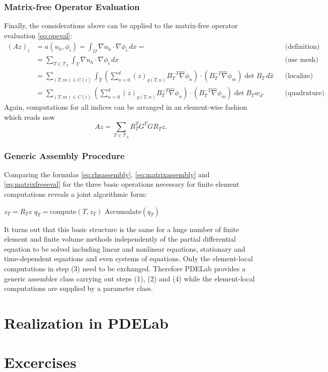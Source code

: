 \documentclass[a4paper,
		     11pt,
		     DIV12,
		     DIVcalc,
		     headings=normal,
		     oneside,
		     bibliography=totoc,
		     headsepline=false,
		     headinclude]{scrartcl}
\begin{document}
\subsubsection*{Matrix-free Operator Evaluation}

Finally, the considerations above can be applied to the matrix-free operator
evaluation \eqref{eq:opeval}:
\begin{align*}
(Az)_i  &= a(u_h,\phi_i) =  \int_\Omega \nabla u_h \cdot \nabla \phi_i \,dx =
&&\text{(definition)} \\ 
&= \sum_{T\in\mathcal{T}_h} \int_T \nabla u_h \cdot \nabla \phi_i \,dx
&&\text{(use mesh)}\\
&= \sum_{(T,m)\in C(i)}
\int_{\hat T} 
\left(\sum_{n=0}^d (z)_{g(T,n)} B_T^{-T} \hat\nabla\phi_n\right)
\cdot (B_T^{-T} \hat\nabla\phi_m) \det B_T \,d\hat x &&\text{(localize)}\\
&= \sum_{(T,m)\in C(i)}
\left(\sum_{n=0}^d (z)_{g(T,n)} B_T^{-T} \hat\nabla\phi_n\right)
\cdot (B_T^{-T} \hat\nabla\phi_m) \det B_T w_d . &&\text{(quadrature)}
\end{align*}
Again, computations for all indices can be arranged in an element-wise fashion
which reads now
\begin{equation}
Az =  \sum_{T\in\mathcal{T}_h} R_T^T G^T G R_T z.
\label{eq:matrixfreeeval}
\end{equation}

\subsubsection*{Generic Assembly Procedure}

Comparing the formulas \eqref{eq:rhsassembly}, \eqref{eq:matrixassembly}
and \eqref{eq:matrixfreeeval} for the three basic operations necessary for
finite element computations reveals a joint algorithmic form:
\begin{algorithmic}[1]
 
\State $z_T = R_T z$ 
\State $q_T=\text{compute}(T,z_T)$ 
\State $\text{Accumulate}(q_T)$ 
\EndFor
\end{algorithmic}

It turns out that this basic structure is the same for a huge number
of  finite element and finite volume methods independently of
the partial differential equation to be solved including linear
and nonlinear equations, stationary and time-dependent equations
and even systems of equations. Only the element-local
computations in step (3) need to be exchanged. Therefore PDELab
provides a generic assembler class carrying out steps (1), (2) and (4)
while the element-local computations are supplied by a parameter class.

\section{Realization in PDELab}

\section{Excercises}



\end{document}
